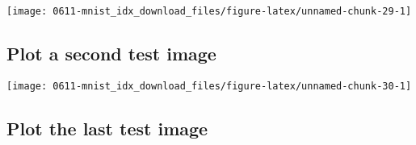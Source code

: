 \documentclass[]{book}
\newenvironment{Shaded}{\begin{snugshade}}{\end{snugshade}}
\newcommand{\CommentTok}[1]{\textcolor[rgb]{0.56,0.35,0.01}{\textit{#1}}}
\newcommand{\DataTypeTok}[1]{\textcolor[rgb]{0.13,0.29,0.53}{#1}}
\newcommand{\DecValTok}[1]{\textcolor[rgb]{0.00,0.00,0.81}{#1}}
\newcommand{\KeywordTok}[1]{\textcolor[rgb]{0.13,0.29,0.53}{\textbf{#1}}}
\newcommand{\NormalTok}[1]{#1}
\newcommand{\OperatorTok}[1]{\textcolor[rgb]{0.81,0.36,0.00}{\textbf{#1}}}
\newcommand{\StringTok}[1]{\textcolor[rgb]{0.31,0.60,0.02}{#1}}
\begin{document}
\begin{center}\texttt{[image: 0611-mnist\_idx\_download\_files/figure-latex/unnamed-chunk-29-1]} \end{center}

\hypertarget{plot-a-second-test-image}{%
\subsection{Plot a second test image}\label{plot-a-second-test-image}}

\begin{Shaded}
\end{Shaded}

\begin{center}\texttt{[image: 0611-mnist\_idx\_download\_files/figure-latex/unnamed-chunk-30-1]} \end{center}

\hypertarget{plot-the-last-test-image}{%
\subsection{Plot the last test image}\label{plot-the-last-test-image}}
\end{document}
